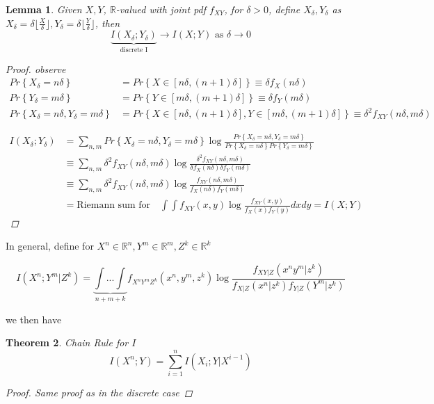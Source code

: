 \documentclass[twoside]{article}
\newtheorem{theorem}{Theorem}[section]
\newtheorem{lemma}[theorem]{Lemma}
\theoremstyle{definition} %
\renewcommand{\Pr}[1]{Pr\left\{#1\right\}}
\def\R{\mathbb{R}}
\begin{document}
\begin{lemma}
  Given $X, Y$, $\R$-valued with joint pdf $f_{XY}$, for $\delta > 0$, define $X_{\delta}, Y_{\delta}$ as $X_{\delta} = \delta \lfloor \frac{X}{\delta} \rfloor, Y_{\delta} = \delta \lfloor \frac{Y}{\delta} \rfloor$, then
  \[
    \underbrace{I(X_{\delta}; Y_{\delta})}_{\text{discrete I}} \rightarrow I(X ; Y) \text{ as } \delta \rightarrow 0
  \]

  \begin{proof}
    observe
    \begin{align*}
      \Pr{X_{\delta} = n \delta} &= \Pr{X \in [n \delta, (n+1)\delta]} \equiv \delta f_X(n \delta) \\
      \Pr{Y_{\delta} = m \delta} &= \Pr{Y \in [m \delta, (m+1)\delta]} \equiv \delta f_Y(m \delta) \\
      \Pr{X_{\delta} = n \delta, Y_{\delta} = m \delta}
      &= \Pr{X \in [n \delta, (n+1) \delta], Y \in [m \delta, (m+1)\delta]} \equiv \delta^2 f_{XY}(n \delta, m \delta)
    \end{align*}

    \begin{align*}
      I(X_{\delta} ; Y_{\delta})
      &= \sum_{n, m} \Pr{X_{\delta} = n \delta, Y_{\delta} = m \delta} \log \frac{\Pr{X_{\delta} = n \delta, Y_{\delta} = m \delta}}{\Pr{X_{\delta} = n \delta} \Pr{Y_{\delta} = m \delta}} \\
      &\equiv \sum_{n, m} \delta^2 f_{XY} (n \delta, m \delta) \log \frac{\delta^2 f_{XY}(n \delta, m \delta)}{\delta f_X(n \delta) \delta f_Y(m \delta)} \\
      &\equiv \sum_{n, m} \delta^2 f_{XY} (n \delta, m \delta) \log \frac{f_{XY}(n \delta, m \delta)}{f_X(n \delta) f_Y(m \delta)} \\
      &= \text{Riemann sum for} \quad \int \int f_{XY}(x,y) \log \frac{f_{XY}(x,y)}{f_X(x) f_Y(y)}dx dy = I(X ; Y)
    \end{align*}
  \end{proof}
\end{lemma}

In general, define for $X^n \in \R^n, Y^m \in \R^m, Z^k \in \R^k$

\[
  I(X^n ; Y^m | Z^k) = \underbrace{\int ... \int}_{n + m + k} f_{X^n Y^m Z^k}(x^n, y^m, z^k) \log \frac{f_{XY|Z}(x^n y^m | z^k)}{f_{X|Z}(x^n | z^k) f_{Y|Z}(Y^m | z^k)}
\]

we then have

\begin{theorem}{Chain Rule for $I$}
  \[
    I(X^n ; Y) = \sum_{i = 1}^n I(X_i ; Y | X^{i - 1})
  \]
  \begin{proof}
    Same proof as in the discrete case
  \end{proof}
\end{theorem}
\end{document}
